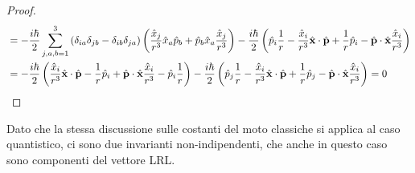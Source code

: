 \begin{proof}
\begin{equation*}
\begin{split}
			&= - \frac{i\hbar}{2} \sum_{j,a,b = 1}^{3} \left( \delta_{ia} \delta_{jb} - \delta_{ib} \delta_{ja} \right) \left( \frac{\hat{x}_j}{r^3} \hat{x}_a \hat{p}_b + \hat{p}_b \hat{x}_a \frac{\hat{x}_j}{r^3} \right) - \frac{i\hbar}{2} \left( \hat{p}_i \frac{1}{r} - \frac{\hat{x}_i}{r^3} \hat{\mathbf{x}}\cdot\hat{\mathbf{p}} + \frac{1}{r} \hat{p}_i - \hat{\mathbf{p}}\cdot\hat{\mathbf{x}} \frac{\hat{x}_i}{r^3} \right) \\
			&= - \frac{i\hbar}{2} \left( \frac{\hat{x}_i}{r^3} \hat{\mathbf{x}}\cdot\hat{\mathbf{p}} - \frac{1}{r} \hat{p}_i + \hat{\mathbf{p}}\cdot\hat{\mathbf{x}} \frac{\hat{x}_i}{r^3} - \hat{p}_i \frac{1}{r} \right) - \frac{i\hbar}{2} \left( \hat{p}_j \frac{1}{r} - \frac{\hat{x}_i}{r^3} \hat{\mathbf{x}}\cdot\hat{\mathbf{p}} + \frac{1}{r} \hat{p}_j - \hat{\mathbf{p}}\cdot\hat{\mathbf{x}} \frac{\hat{x}_i}{r^3} \right) = 0
		\end{split}
	\end{equation*}
\end{proof}

Dato che la stessa discussione sulle costanti del moto classiche si applica al caso quantistico, ci sono due invarianti non-indipendenti, che anche in questo caso sono componenti del vettore LRL.

